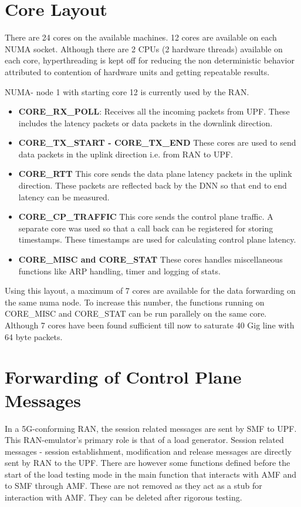 

\section{Core Layout}
There are 24 cores on the available machines. 12 cores are available on each NUMA socket.
Although there are 2 CPUs (2 hardware threads) available on each core, hyperthreading is
kept off for reducing the non deterministic behavior attributed to contention of hardware units
and getting repeatable results.

NUMA- node 1 with starting core 12 is currently used by the RAN.


\begin{itemize}
	\item \textbf{CORE\_RX\_POLL}: Receives all the incoming packets from UPF. These includes the latency packets or data packets in the downlink direction.
	\item \textbf{CORE\_TX\_START - CORE\_TX\_END}
	      These cores are used to send data packets in the uplink  direction i.e. from RAN to UPF.
	\item \textbf{CORE\_RTT}
	      This core sends the data plane latency packets in the uplink direction. These packets are reflected back by the DNN so that end to end latency can be measured.
	\item \textbf{CORE\_CP\_TRAFFIC} This core sends the control plane traffic. A separate core was used so that a call back can be registered for storing timestamps. These timestamps are used for calculating control plane latency.
	\item \textbf{CORE\_MISC and CORE\_STAT}
	      These cores handles miscellaneous functions like ARP handling, timer and logging of stats.
\end{itemize}
Using this layout, a maximum of 7 cores are available for the data forwarding on the same numa node.
To increase this number, the functions running on CORE\_MISC and CORE\_STAT can be run parallely on the same core. Although 7 cores have been found sufficient till now to saturate 40 Gig line with 64 byte packets.

\section{Forwarding of Control Plane Messages}
In a 5G-conforming RAN, the session related messages are sent by SMF to UPF.
This RAN-emulator's primary role is that of a load generator. Session related messages - session establishment, modification and release messages are directly sent by RAN to the UPF.
There are however some functions defined before the start of the load testing mode in the main function that interacts with AMF and to SMF through AMF. These are not removed as they act as a stub for interaction with AMF. They can be deleted after rigorous testing.

